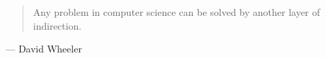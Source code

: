 \begin{frame}
	\begin{quotation}
		Any problem in computer science can be solved by another layer of indirection.
	\end{quotation}
	\vspace*{-1em}
	\begin{flushright}
		\textup{
		--- David Wheeler
		}
	\end{flushright}
\end{frame}